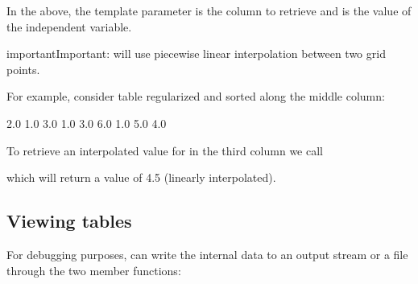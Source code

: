 \documentclass[letterpaper,10pt,english]{sphinxmanual}
\begin{document}
\sphinxAtStartPar
In the above, the template parameter  is the column to retrieve and  is the value of the independent variable.

\begin{sphinxadmonition}{important}{Important:}
\sphinxAtStartPar
{} will  use piecewise linear interpolation between two grid points.
\end{sphinxadmonition}

\sphinxAtStartPar
For example, consider table regularized and sorted along the middle column:

\begin{sphinxVerbatim}[commandchars=\\\{\},formatcom=\scriptsize]
2.0  1.0  3.0
1.0  3.0  6.0
1.0  5.0  4.0
\end{sphinxVerbatim}

\sphinxAtStartPar
To retrieve an interpolated value for  in the third column we call

\begin{sphinxVerbatim}[commandchars=\\\{\},formatcom=\scriptsize]
 

    
\end{sphinxVerbatim}

\sphinxAtStartPar
which will return a value of 4.5 (linearly interpolated).


\subsection{Viewing tables}
\label{\detokenize{Utilities/LookupTable:viewing-tables}}
\sphinxAtStartPar
For debugging purposes,  can write the internal data to an output stream or a file through the two member functions:

\begin{sphinxVerbatim}[commandchars=\\\{\},formatcom=\scriptsize]
     

    
\end{sphinxVerbatim}
\end{document}
